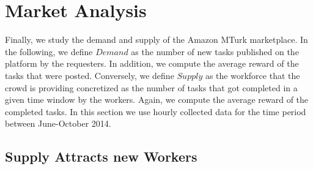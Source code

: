 \section{Market Analysis}
\label{sec:market}
Finally, we study the demand and supply of the Amazon MTurk marketplace. In the following, we define $Demand$ as the number of new tasks published on the platform by the requesters. In addition, we compute the average reward of the tasks that were posted. Conversely, we define $Supply$ as the workforce that the crowd is providing concretized as the number of tasks that got completed in a given time window by the workers. Again, we compute the average reward of the completed tasks.
In this section we use hourly collected data for the time period between June-October 2014.

%

\subsection{Supply Attracts new Workers} %

%

